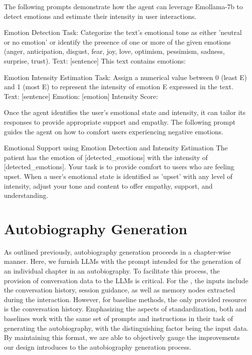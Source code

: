 The following prompts demonstrate how the agent can leverage Emollama-7b to detect emotions and estimate their intensity in user interactions.

\begin{mybox}{Emotion Detection}
Task: Categorize the text's emotional tone as either 'neutral or no emotion' or identify the presence of one or more of the given emotions (anger, anticipation, disgust, fear, joy, love, optimism, pessimism, sadness, surprise, trust).
Text: [sentence]
This text contains emotions:
\end{mybox}

\begin{mybox}{Emotion Intensity Estimation}
Task: Assign a numerical value between 0 (least E) and 1 (most E) to represent the intensity of emotion E expressed in the text.
Text: [sentence]
Emotion: [emotion]
Intensity Score:
\end{mybox}

Once the agent identifies the user's emotional state and intensity, it can tailor its responses to provide appropriate support and empathy. The following prompt guides the agent on how to comfort users experiencing negative emotions.
\begin{mybox}{Emotional Support using Emotion Detection and Intensity Estimation}
    The patient has the emotion of [detected\_emotions] with the intensity of [detected\_emotions]. Your task is to provide comfort to users who are feeling upset. When a user's emotional state is identified as 'upset' with any level of intensity, adjust your tone and content to offer empathy, support, and understanding.
\end{mybox}

\section{Autobiography Generation}\label{appendix:autobiography_generation}
As outlined previously, autobiography generation proceeds in a chapter-wise manner. Here, we furnish LLMs with the prompt intended for the generation of an individual chapter in an autobiography. To facilitate this process, the provision of conversation data to the LLMs is critical. For the \methodname, the inputs include the conversation history, session guidance, as well as memory nodes extracted during the interaction. However, for baseline methods, the only provided resource is the conversation history. Emphasizing the aspects of standardization, both \methodname and baselines work with the same set of prompts and instructions in their task of generating the autobiography, with the distinguishing factor being the input data. By maintaining this format, we are able to objectively gauge the improvements our design introduces to the autobiography generation process.

